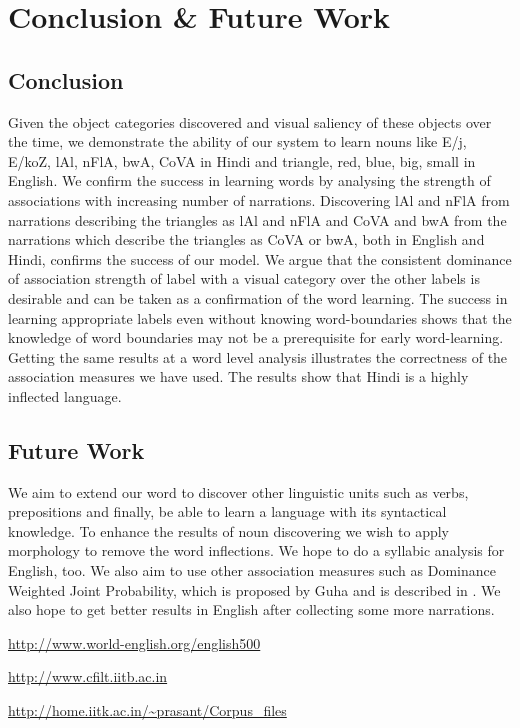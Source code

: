\documentclass[12pt, a4paper]{report}
\begin{document}
\chapter{Conclusion \& Future Work}
\section{Conclusion}
Given the object categories discovered and visual saliency of these objects over the time, we demonstrate the ability of our system to learn nouns like {\dn E/j}, {\dn E/koZ}, {\dn lAl}, {\dn nFlA}, {\dn bwA}, {\dn CoVA} in Hindi and  triangle, red, blue, big, small in English. We confirm the success in learning words by analysing the strength of associations with increasing number of narrations. Discovering {\dn lAl} and {\dn nFlA} from narrations describing the triangles as {\dn lAl} and {\dn nFlA} and {\dn CoVA} and {\dn bwA} from the narrations which describe the triangles as {\dn CoVA} or {\dn bwA}, both in English and Hindi, confirms the success of our model. We argue that the consistent dominance of association strength of label with a visual category over the other labels is desirable and can be taken as a confirmation of the word learning. The success in learning appropriate labels even without knowing word-boundaries shows that the knowledge of word boundaries may not be a prerequisite for early word-learning. Getting the same results at a word level analysis illustrates the correctness of the association measures we have used. The results show that Hindi is a highly inflected language.
\section{Future Work}
We aim to extend our word to discover other linguistic units such as verbs, prepositions and finally, be able to learn a language with its syntactical knowledge. To enhance the results of noun discovering we wish to apply morphology to remove the word inflections. We hope to do a syllabic analysis for English, too. We also aim to use other association measures such as Dominance Weighted Joint Probability, which is proposed by Guha and is described in \cite{}. We also hope to get better results in English after collecting some more narrations.

\begin{thebibliography}{1}
  
\bibitem{}\url{http://www.world-english.org/english500}

\bibitem{}\url{http://www.cfilt.iitb.ac.in}

\bibitem{}\url{http://home.iitk.ac.in/~prasant/Corpus_files}

\end{thebibliography}
\end{document}
